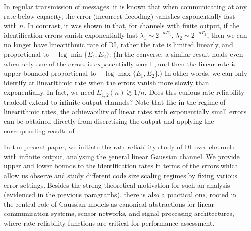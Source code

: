 \documentclass[10pt,conference]{IEEEtran}
\newcommand{\1}{\mathds{1}}
\begin{document}
In regular transmission of messages, it is known that when communicating at any rate below capacity, the error (incorrect decoding) vanishes exponentially fast with $n$. In contrast, it was shown in \cite{CDBW:Reliability-TCOM} that, for channels with finite output, if the identification errors vanish exponentially fast $\lambda_{1}\sim 2^{-nE_{1}}$, $\lambda_{2}\sim 2^{-nE_{2}}$, then we can no longer have linearithmic rate of DI, rather the rate is limited linearly, and proportional to $-\log\min\{E_1,E_2\}$. (In the converse, a similar result holds even when only one of the errors is exponentially small \cite{DI-steins}, and then the linear rate is upper-bounded proportional to $-\log\max\{E_1,E_2\}$.) In other words, we can only identify at linearithmic rate when the errors vanish more slowly than exponentially. In fact, we need $E_{1,2}(n) \gtrsim 1/n$. 
Does this curious rate-reliability tradeoff extend to 
infinite-output channels? Note that like in the regime of linearithmic rates, the achievability of linear rates with exponentially small errors can be obtained directly from discretising the output and applying the corresponding results of \cite{CDBW:Reliability-TCOM}. 

In the present paper, we initiate the rate-reliability study of DI over channels with infinite output, analysing the general linear Gaussian channel. We provide upper and lower bounds to the identification rates in terms of the errors which allow us observe and study different code size scaling regimes by fixing various error settings. Besides the strong theoretical motivation for such an analysis (evidenced in the previous paragraphs), there is also a practical one, rooted in the central role of Gaussian models as canonical abstractions for linear communication systems, sensor networks, and signal processing architectures, where rate-reliability functions are critical for performance assessment.

\end{document}
